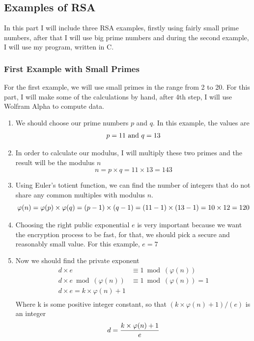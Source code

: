 \documentclass[a4paper, 12pt]{article}
\begin{document}
\subsection{Examples of RSA}
\label{bsec:example}

In this part I will include three RSA examples, firstly using fairly small prime numbers, after that
I will use big prime numbers and during the second example, I will use my program, written in C.\\

\subsubsection{First Example with Small Primes}
\label{bbsec:first}

For the first example, we will use small primes in the range from 2 to 20. For this part, I will make
some of the calculations by hand, after 4th step, I will use Wolfram Alpha to compute data.

\begin{enumerate}
\item We should choose our prime numbers $p$ and $q$. In this example, the values are
  \begin{equation*}
    p=11 \text{ and } q=13\\
  \end{equation*}
  \item In order to calculate our modulus, I will multiply these two primes and the result will be
    the modulus $n$
    \begin{equation*}
      n=p \times q=11 \times 13=143
    \end{equation*}
    \item Using Euler's totient function, we can find the number of integers that do not share any
      common multiples with modulus $n$.
      \begin{equation*}
        \varphi(n)=\varphi(p) \times \varphi(q)=(p-1) \times (q-1)=(11-1) \times (13-1)=10 \times 12=120\\
      \end{equation*}
      \item Choosing the right public exponential $e$ is very important because we want the encryption
process to be fast, for that, we should pick a secure and reasonably small value. For this
example, $e=7$

\item Now we should find the private exponent
  \begin{align*}
    d \times e &\equiv 1 \bmod(\varphi(n))\\
    d \times e \bmod(\varphi(n)) &\equiv 1 \bmod(\varphi(n)) =1\\
    d \times e = k \times \varphi(n) + 1\\
  \end{align*}
  Where k is some positive integer constant, so that $(k \times \varphi(n) + 1)/(e)$ is an integer
  \begin{equation*}
    d = \frac{k \times \varphi(n)+1}{e}\\
    \end{equation*}
\end{enumerate}
\end{document}
